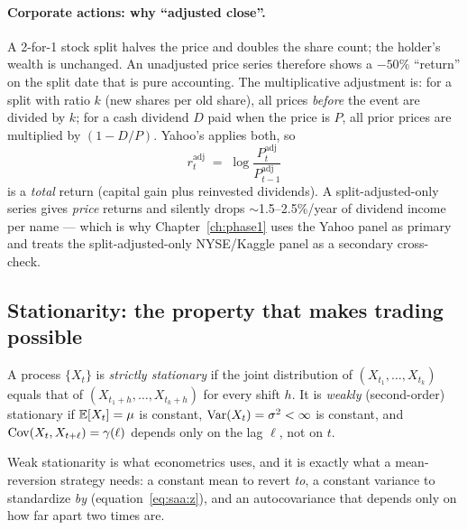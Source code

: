 \paragraph{Corporate actions: why ``adjusted close''.} A 2-for-1 stock split halves the
price and doubles the share count; the holder's wealth is unchanged. An unadjusted
price series therefore shows a $-50\%$ ``return'' on the split date that is pure
accounting. The multiplicative adjustment is: for a split with ratio $k$ (new shares per
old share), all prices \emph{before} the event are divided by $k$; for a cash dividend
$D$ paid when the price is $P$, all prior prices are multiplied by $(1-D/P)$. Yahoo's
 applies both, so
\begin{equation}
  r_t^{\text{adj}} \;=\; \log\frac{P^{\text{adj}}_t}{P^{\text{adj}}_{t-1}}
  \label{eq:totalreturn}
\end{equation}
is a \emph{total} return (capital gain plus reinvested dividends). A split-adjusted-only
series gives \emph{price} returns and silently drops $\sim$1.5--2.5\%/year of dividend
income per name --- which is why Chapter~\ref{ch:phase1} uses the Yahoo panel as primary
and treats the split-adjusted-only NYSE/Kaggle panel as a secondary cross-check.

\subsection{Stationarity: the property that makes trading possible}
\label{sec:prob:stationarity}

\begin{definition}
A process $\{X_t\}$ is \emph{strictly stationary} if the joint distribution of
$(X_{t_1},\dots,X_{t_k})$ equals that of $(X_{t_1+h},\dots,X_{t_k+h})$ for every shift
$h$. It is \emph{weakly} (second-order) stationary if
$\mathbb{E}[X_t]=\mu$ is constant, $\operatorname{Var}(X_t)=\sigma^2<\infty$ is constant, and
$\operatorname{Cov}(X_t,X_{t+\ell})=\gamma(\ell)$ depends only on the lag $\ell$, not on $t$.
\end{definition}

Weak stationarity is what econometrics uses, and it is exactly what a mean-reversion
strategy needs: a constant mean to revert \emph{to}, a constant variance to
standardize \emph{by} (equation~\eqref{eq:saa:z}), and an autocovariance that depends
only on how far apart two times are.


